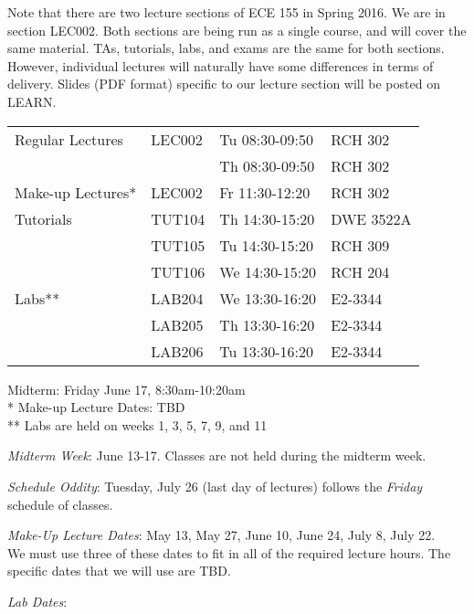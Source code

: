 \documentclass[letterpaper,10pt]{article}
\begin{document}
Note that there are two lecture sections of ECE 155 in Spring 2016. We are in section LEC002. Both sections are being run as a single course, and will cover the same material. TAs, tutorials, labs, and exams are the same for both sections. However, individual lectures will naturally have some differences in terms of delivery. Slides (PDF format) specific to our lecture section will be posted on LEARN.

\begin{table}[h]
        \begin{center}
        \begin{tabular}{l l l l}
				Regular Lectures & LEC002 & Tu 08:30-09:50 & RCH 302 	\\
								 & 		  & Th 08:30-09:50 & RCH 302 	\\
				\hline
				Make-up Lectures*& LEC002 & Fr 11:30-12:20 & RCH 302 	\\
				\hline			
				Tutorials 		 & TUT104 & Th 14:30-15:20 & DWE 3522A 	\\
						  		 & TUT105 & Tu 14:30-15:20 & RCH 309   	\\
						  		 & TUT106 & We 14:30-15:20 & RCH 204   	\\
				\hline			
				Labs** 	  		 & LAB204 & We 13:30-16:20 & E2-3344	\\
								 & LAB205 & Th 13:30-16:20 & E2-3344	\\
								 & LAB206 & Tu 13:30-16:20 & E2-3344	\\
				\hline
			\end{tabular}
        \end{center}
        Midterm: Friday June 17, 8:30am-10:20am				\\
		*    Make-up Lecture Dates: TBD						\\
		**   Labs are held on weeks 1, 3, 5, 7, 9, and 11 	\\
\end{table}

\textit{Midterm Week}: June 13-17. Classes are not held during the midterm week.

\textit{Schedule Oddity}: Tuesday, July 26 (last day of lectures) follows the \textit{Friday} schedule of classes.

\textit{Make-Up Lecture Dates}: May 13, May 27, June 10, June 24, July 8, July 22. \\
We must use three of these dates to fit in all of the required lecture hours. The specific dates that we will use are TBD.

\textit{Lab Dates}:
\end{document}
